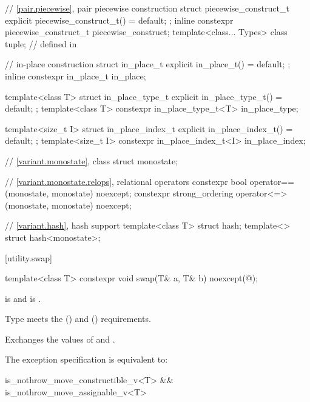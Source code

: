 \begin{codeblock}
{  // \ref{pair.piecewise}, pair piecewise construction
  struct piecewise_construct_t {
    explicit piecewise_construct_t() = default;
  };
  inline constexpr piecewise_construct_t piecewise_construct{};
  template<class... Types> class tuple;         // defined in 

  // in-place construction%
%
%
%
%
%
  struct in_place_t {
    explicit in_place_t() = default;
  };
  inline constexpr in_place_t in_place{};

  template<class T>
    struct in_place_type_t {
      explicit in_place_type_t() = default;
    };
  template<class T> constexpr in_place_type_t<T> in_place_type{};

  template<size_t I>
    struct in_place_index_t {
      explicit in_place_index_t() = default;
    };
  template<size_t I> constexpr in_place_index_t<I> in_place_index{};

  // \ref{variant.monostate}, class %
  struct monostate;

  // \ref{variant.monostate.relops},  relational operators%
%
  constexpr bool operator==(monostate, monostate) noexcept;
  constexpr strong_ordering operator<=>(monostate, monostate) noexcept;

  // \ref{variant.hash}, hash support%
  template<class T> struct hash;
  template<> struct hash<monostate>;
}
\end{codeblock}

[utility.swap]{}

%
\begin{itemdecl}
template<class T>
  constexpr void swap(T& a, T& b) noexcept(@\seebelow@);
\end{itemdecl}

\begin{itemdescr}
\pnum
\constraints
{} is  and
 is .

\pnum
\expects
Type
meets the
 ()
and
 ()
requirements.

\pnum
\effects
Exchanges the values of  and .

\pnum
\remarks
The exception specification is equivalent to:

\begin{codeblock}
is_nothrow_move_constructible_v<T> && is_nothrow_move_assignable_v<T>
\end{codeblock}
\end{itemdescr}

